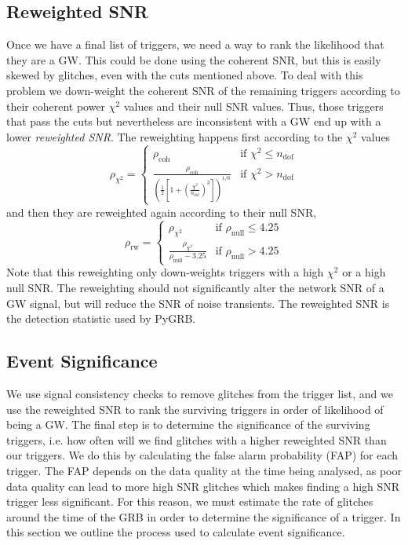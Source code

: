 \documentclass[11pt]{cuthesis}
\begin{document}
\subsection{Reweighted SNR} \label{sec:reweighted snr}
Once we have a final list of triggers, we need a way to rank the likelihood that they are a GW. This could be done using the coherent SNR, but this is easily skewed by glitches, even with the cuts mentioned above. To deal with this problem we down-weight the coherent SNR of the remaining triggers according to their coherent power $\chi^2$ values and their null SNR values. Thus, those triggers that pass the cuts but nevertheless are inconsistent with a GW end up with a lower \textit{reweighted SNR}. The reweighting happens first according to the $\chi^2$ values
\begin{equation}  \label{chi2 reweigth}
\rho_{\chi^2} = \begin{cases} \rho_\text{coh} & \mbox{if } \chi^2 \leq n_\text{dof} \\ \frac{\rho_\text{coh}}{\left( \frac{1}{2} \left[ 1 + \left( \frac{\chi^2}{n_\text{dof}} \right)^3 \right] \right)^{1/6} } & \mbox{if } \chi^2 > n_\text{dof}\end{cases}
\end{equation}  
and then they are reweighted again according to their null SNR,
\begin{equation} \label{null reweight}
\rho_\text{rw} = \begin{cases} \rho_{\chi^2} & \mbox{if } \rho_\text{null} \leq 4.25 \\ \frac{\rho_{\chi^2}}{ \rho_\text{null} -3.25} & \mbox{if } \rho_\text{null} > 4.25\end{cases}
\end{equation}
Note that this reweighting only down-weights triggers with a high $\chi^2$ or a high null SNR. The reweighting should not significantly alter the network SNR of a GW signal, but will reduce the SNR of noise transients. The reweighted SNR is the detection statistic used by PyGRB. 





\subsection{Event Significance} \label{sec:event sig}
We use signal consistency checks to remove glitches from the trigger list, and we use the reweighted SNR to rank the surviving triggers in order of likelihood of being a GW. The final step is to determine the significance of the surviving triggers, i.e. how often will we find glitches with a higher reweighted SNR than our triggers. We do this by calculating the false alarm probability (FAP) for each trigger. The FAP depends on the data quality at the time being analysed, as poor data quality can lead to more high SNR glitches which makes finding a high SNR trigger less significant. For this reason, we must estimate the rate of glitches around the time of the GRB in order to determine the significance of a trigger. In this section we outline the process used to calculate event significance. 
\end{document}
